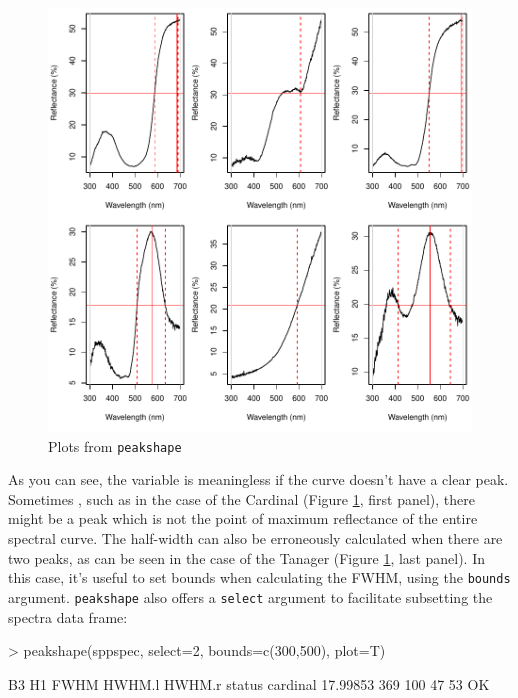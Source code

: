 \documentclass{article}
\newcommand{\code}[1]{{\tt #1}}  %
\begin{document}
\begin{figure}[H] %
\begin{center}
\includegraphics[width=5in]{pavo-fwhm}
\end{center}
\caption{Plots from \code{peakshape}}
\label{figure:fwhm}
\end{figure}

As you can see, the variable is meaningless if the curve doesn't have a clear peak. Sometimes
, such as in the case of the Cardinal (Figure \ref{figure:fwhm}, first panel), there might be a 
peak which is not the point of maximum reflectance of the entire spectral curve. The half-width 
can also be erroneously calculated when there are two peaks, as can be seen in the case of the 
Tanager (Figure \ref{figure:fwhm}, last panel). In this case, it's useful to set bounds when 
calculating the FWHM, using the \code{bounds} argument. \code{peakshape} also offers a 
\code{select} argument to facilitate subsetting the spectra data frame:

\begin{Schunk}
\begin{Sinput}
> peakshape(sppspec, select=2, bounds=c(300,500), plot=T)
\end{Sinput}
\begin{Soutput}
               B3  H1 FWHM HWHM.l HWHM.r status
cardinal 17.99853 369  100     47     53     OK
\end{Soutput}
\end{Schunk}
\end{document}
